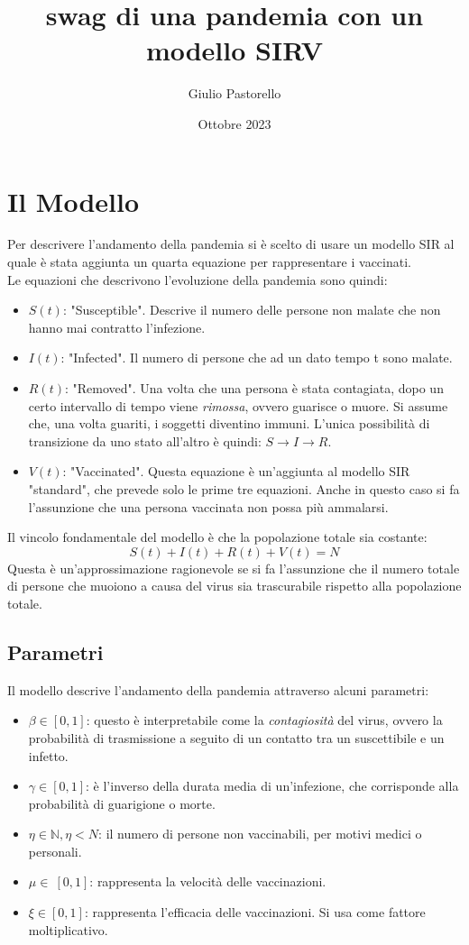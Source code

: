 \documentclass{article}
\title{swag di una pandemia con un modello SIRV}
\author{Giulio Pastorello }
\date{Ottobre 2023}
\begin{document}
\maketitle

\section{Il Modello}

\hspace{\parindent} Per descrivere l'andamento della pandemia si è scelto 
di usare un modello SIR al quale è stata aggiunta un quarta 
equazione per rappresentare i vaccinati.\\
Le equazioni che descrivono l'evoluzione della pandemia sono quindi:
\begin{itemize}
\item $S(t)$: "Susceptible". Descrive il numero delle persone non 
malate che non hanno mai contratto l'infezione.
\item $I(t)$: "Infected". Il numero di persone che ad un dato tempo 
t sono malate. 
\item $R(t)$: "Removed". Una volta che una persona è stata 
contagiata, dopo un certo intervallo di tempo viene \textit{rimossa}, 
ovvero guarisce o muore. Si assume che, una volta guariti, 
i soggetti diventino immuni. L'unica possibilità di transizione da 
uno stato all'altro è quindi: $S\xrightarrow{}I\xrightarrow{}R$.
\item $V(t)$: "Vaccinated". Questa equazione è un'aggiunta al modello 
SIR "standard", che prevede solo le prime tre equazioni. 
Anche in questo caso si fa l'assunzione che una persona vaccinata 
non possa più ammalarsi.
\end{itemize}
Il vincolo fondamentale del modello è che la popolazione totale 
sia costante:
$$S(t)+I(t)+R(t)+V(t)=N$$
Questa è un'approssimazione ragionevole se si fa l'assunzione 
che il numero totale di persone che muoiono a causa del virus 
sia trascurabile rispetto alla popolazione totale.
\subsection{Parametri}
Il modello descrive l'andamento della pandemia attraverso alcuni 
parametri:
\begin{itemize} 
\item $\beta \in [0,1]$: questo è interpretabile come la 
\textit{contagiosità} del virus, ovvero la probabilità di 
trasmissione a seguito di un contatto tra un suscettibile e un infetto.
\item $\gamma \in [0,1]$: è l'inverso della durata media di 
un'infezione, che corrisponde alla probabilità di guarigione o morte.
\item $\eta \in \mathbb{N}, \eta < N$: il numero di persone non 
vaccinabili, per motivi medici o personali.
\item $\mu \in\ [0,1]$: rappresenta la velocità delle vaccinazioni.
\item $\xi \in [0,1]$: rappresenta l'efficacia delle vaccinazioni. 
Si usa come fattore moltiplicativo.
\end{itemize}
\end{document}
